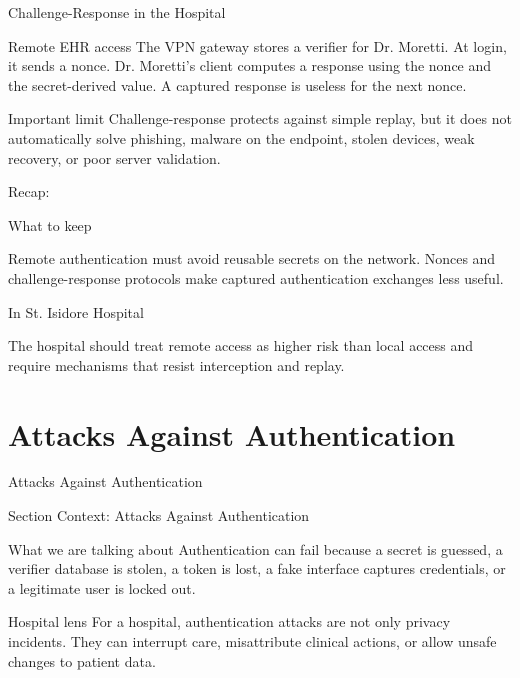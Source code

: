 \documentclass[presentation]{beamer}
\newcommand{\sectiontitleframe}[1]{
\begin{frame}[plain,c]
\begin{center}
{\usebeamerfont{title}\usebeamercolor[fg]{title}#1}
\end{center}
\end{frame}
}
\newcommand{\scenario}{St. Isidore Hospital}
\newcommand{\takeawaysframe}[2]{
  \begin{frame}[c]{Recap: \insertsection}
    \begin{block}{What to keep}
      #1
    \end{block}
    \begin{exampleblock}{In \scenario}
      #2
    \end{exampleblock}
  \end{frame}
}
\begin{document}
\begin{frame}[c]{Challenge-Response in the Hospital}
  \begin{exampleblock}{Remote EHR access}
    The VPN gateway stores a verifier for Dr. Moretti. At login, it sends a nonce. Dr. Moretti's client computes a response using the nonce and the secret-derived value. A captured response is useless for the next nonce.
  \end{exampleblock}

  \begin{block}{Important limit}
    Challenge-response protects against simple replay, but it does not automatically solve phishing, malware on the endpoint, stolen devices, weak recovery, or poor server validation.
  \end{block}
\end{frame}

\takeawaysframe{
  Remote authentication must avoid reusable secrets on the network. Nonces and challenge-response protocols make captured authentication exchanges less useful.
}{
  The hospital should treat remote access as higher risk than local access and require mechanisms that resist interception and replay.
}

\section{Attacks Against Authentication}
\sectiontitleframe{Attacks Against Authentication}

\begin{frame}[c]{Section Context: Attacks Against Authentication}
\begin{block}{What we are talking about}
Authentication can fail because a secret is guessed, a verifier database is stolen, a token is lost,
a fake interface captures credentials, or a legitimate user is locked out.
\end{block}

\begin{exampleblock}{Hospital lens}
For a hospital, authentication attacks are not only privacy incidents. They can interrupt care,
misattribute clinical actions, or allow unsafe changes to patient data.
\end{exampleblock}
\end{frame}
\end{document}
